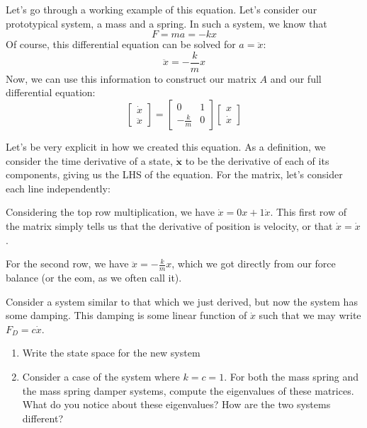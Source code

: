 \begin{example}
Let's go through a working example of this equation. Let's consider our prototypical system, a mass and a spring. In such a system, we know that
$$F=ma=-kx$$
Of course, this differential equation can be solved for $a=\ddot{x}$:
$$\ddot{x}=-\frac{k}{m}x$$
Now, we can use this information to construct our matrix $A$ and our full differential equation:
$$\begin{bmatrix}
    \dot{x}\\
    \ddot{x}
\end{bmatrix} = \begin{bmatrix}
    0 &1\\-\frac{k}{m}&0
\end{bmatrix}\begin{bmatrix}
    x\\
    \dot{x}
\end{bmatrix}$$

Let's be very explicit in how we created this equation. As a definition, we consider the time derivative of a state, $\bm{\dot{x}}$ to be the derivative of each of its components, giving us the LHS of the equation. For the matrix, let's consider each line independently:

Considering the top row multiplication, we have $\dot{x}=0x+1\dot{x}$. This first row of the matrix simply tells us that the derivative of position is velocity, or that $\dot{x}=\dot{x}$.

For the second row, we have $\ddot{x}=-\frac{k}{m}x$, which we got directly from our force balance (or the \gls{eom}, as we often call it).
\end{example}
\newpage
\begin{exercise}
Consider a system similar to that which we just derived, but now the system has some damping. This damping is some linear function of $\dot{x}$ such that we may write $F_D=c\dot{x}$.

\begin{enumerate}
    \item Write the state space for the new system
    \item Consider a case of the system where $k=c=1$. For both the mass spring and the mass spring damper systems, compute the eigenvalues of these matrices. What do you notice about these eigenvalues? How are the two systems different?
\end{enumerate}
\end{exercise}

